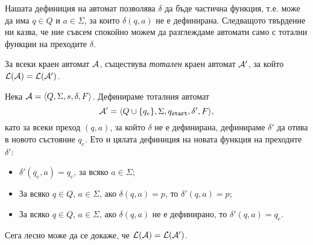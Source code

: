 Нашата дефиниция на автомат позволява $\delta$ да бъде частична функция, т.е.
може да има $q\in Q$ и $a\in\Sigma$, за които $\delta(q,a)$ не е дефинирана.
Следващото твърдение ни казва, че ние съвсем спокойно можем да разглеждаме автомати
само с тотални функции на преходите  $\delta$.
\begin{prop}
  За всеки краен автомат $\mathcal{A}$, съществува {\em тотален} краен автомат $\mathcal{A}'$,
  за който $\mathcal{L}(\mathcal{A}) = \mathcal{L}(\mathcal{A}')$.
\end{prop}
\begin{hint}
  Нека $\mathcal{A} = \langle{Q,\Sigma,s,\delta,F}\rangle$.
  Дефинираме тоталния автомат 
  \[\mathcal{A}' = \langle{Q\cup\{q_e\}, \Sigma, q_{\texttt{start}}, \delta', F}\rangle,\]
  като за всеки преход $(q,a)$, за който $\delta$ не е дефинирана, 
  дефинираме $\delta'$ да отива в новото състояние $q_e$.
  Ето и цялата дефиниция на новата функция на преходите $\delta'$:
  \begin{itemize}
  \item 
    $\delta'(q_e,a) = q_e$, за всяко $a\in\Sigma$;
  \item
    За всяко $q\in Q$, $a\in\Sigma$, ако $\delta(q,a) = p$, то
    $\delta'(q,a) = p$;
  \item
    За всяко $q\in Q$, $a\in\Sigma$, ако $\delta(q,a)$ не е дефинирано, то
    $\delta'(q,a) = q_e$.
  \end{itemize}
  Сега лесно може да се докаже, че $\mathcal{L}(\mathcal{A}) = \mathcal{L}(\mathcal{A}')$.
\end{hint}



